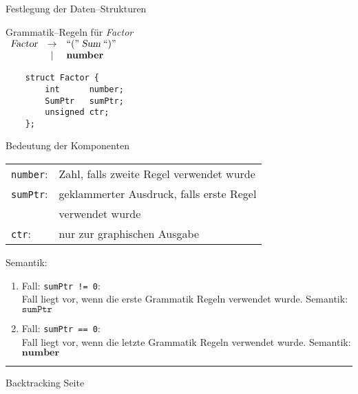 
\begin{slide}{}
\normalsize

\begin{center}
Festlegung der Daten--Strukturen
\end{center}
\vspace*{0.5cm}

\footnotesize
Grammatik--Regeln f\"ur \textsl{Factor} \\[0.3cm]
\hspace*{1.3cm} $\begin{array}{lcl}
       \textsl{Factor} & \rightarrow & ``\mathtt{(}\cq \;\textsl{Sum}\; ``\mathtt{)}\cq   \\
                       & |           & \mathbf{number}                                    \\
 \end{array}$    

\begin{verbatim}
    struct Factor {
        int      number;
        SumPtr   sumPtr;
        unsigned ctr; 
    };
\end{verbatim}

Bedeutung der Komponenten \\[0.3cm]
\hspace*{1.3cm} 
\begin{tabular}{ll}
 \texttt{number}:    & Zahl, falls zweite Regel verwendet wurde                    \\[0.3cm]
 \texttt{sumPtr}:    & geklammerter Ausdruck, falls erste Regel \\
                     & verwendet wurde                    \\[0.3cm]
 \texttt{ctr}:       & nur zur graphischen Ausgabe 
\end{tabular}

Semantik: 
\begin{enumerate}
\item Fall: \texttt{sumPtr != 0}: \\[0.3cm]
      Fall liegt vor, wenn die erste Grammatik Regeln verwendet wurde.
      Semantik: \\[0.3cm]
      \hspace*{1.3cm}  $\mathtt{sumPtr}$
\item Fall: \texttt{sumPtr == 0}: \\[0.3cm]
      Fall liegt vor, wenn die letzte Grammatik Regeln verwendet wurde.
      Semantik: \\[0.3cm]
      \hspace*{1.3cm}  $\mathbf{number}$
\end{enumerate}

\vspace*{\fill}
\tiny \addtocounter{mypage}{1}
\rule{17cm}{1mm}
Backtracking  \hspace*{\fill} Seite 
\end{slide}

